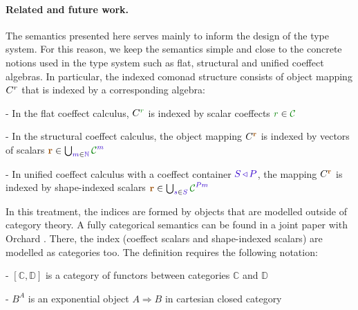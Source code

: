 \paragraph{Related and future work.}
The semantics presented here serves mainly to inform the design of the type system. For this 
reason, we keep the semantics simple and close to the concrete notions used in the type system
such as flat, structural and unified coeffect algebras. In particular, the indexed comonad 
structure consists of object mapping $C^{r}$ that is indexed by a corresponding algebra:

\begin{compactitem}
\item[-] In the flat coeffect calculus, $\ctyp{\cclrd{r}}{}$ is indexed by scalar coeffects $\cclrd{r} \in \C$
\item[-] In the structural coeffect calculus, the object mapping $\ctyp{\aclrd{\textbf{r}}}{}$ is 
  indexed by vectors of scalars $\aclrd{\textbf{r}} \in \bigcup_{\sclrd{m}\in \sclrd{\mathbb{N}}} \C^{\sclrd{m}}$
\item[-] In unified coeffect calculus with a coeffect container $\SH\,\sclrd{\triangleleft}\,\SP$,
  the mapping $\ctyp{\aclrd{\textbf{r}}}{}$ is indexed by shape-indexed scalars 
  $\aclrd{\textbf{r}} \in \bigcup_{\sclrd{s}\in \SH} \C^{\SP\sclrd{m}}$
\end{compactitem}

\noindent
In this treatment, the indices are formed by objects that are modelled outside of category theory.
A fully categorical semantics can be found in a joint paper with Orchard \cite{coeffects-icfp14}. 
There, the index (coeffect scalars and shape-indexed scalars) are modelled as categories too.
The definition requires the following notation:

\begin{compactitem}
\item[-] $[\mathbb{C}, \mathbb{D}]$ is a category of functors between categories $\mathbb{C}$ and $\mathbb{D}$
\item[-] $B^A$ is an exponential object $A \Rightarrow B$ in cartesian closed category
\end{compactitem}

